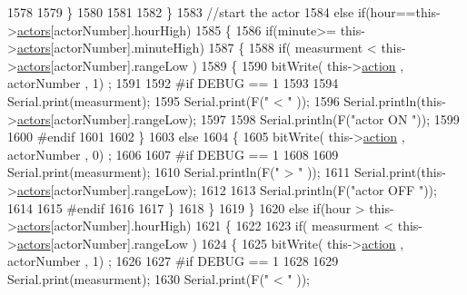 \begin{DoxyCode}
1578             
1579         \}
1580 
1581 
1582     \}
1583     \textcolor{comment}{//start the actor}
1584     \textcolor{keywordflow}{else} \textcolor{keywordflow}{if}(hour==this->\hyperlink{class_jetpack_a7e16d2f97837f9712a2e6de1c50d99db}{actors}[actorNumber].hourHigh)
1585     \{
1586         \textcolor{keywordflow}{if}(minute>= this->\hyperlink{class_jetpack_a7e16d2f97837f9712a2e6de1c50d99db}{actors}[actorNumber].minuteHigh)
1587         \{
1588             \textcolor{keywordflow}{if}( measurment < this->\hyperlink{class_jetpack_a7e16d2f97837f9712a2e6de1c50d99db}{actors}[actorNumber].rangeLow )
1589             \{
1590                 bitWrite( this->\hyperlink{class_jetpack_aca3142925a7b0834b34ae91d26af7765}{action} , actorNumber , 1) ;
1591 
1592 \textcolor{preprocessor}{            #if DEBUG == 1 }
1593 
1594                 Serial.print(measurment);
1595                 Serial.print(F(\textcolor{stringliteral}{" < "} ));
1596                 Serial.println(this->\hyperlink{class_jetpack_a7e16d2f97837f9712a2e6de1c50d99db}{actors}[actorNumber].rangeLow);
1597 
1598                 Serial.println(F(\textcolor{stringliteral}{"actor ON "}));
1599 
1600 \textcolor{preprocessor}{            #endif  }
1601 
1602             \}
1603             \textcolor{keywordflow}{else} 
1604             \{
1605                 bitWrite( this->\hyperlink{class_jetpack_aca3142925a7b0834b34ae91d26af7765}{action} , actorNumber , 0) ;
1606 
1607 \textcolor{preprocessor}{            #if DEBUG == 1 }
1608 
1609                 Serial.print(measurment);
1610                 Serial.println(F(\textcolor{stringliteral}{" > "} ));
1611                 Serial.print(this->\hyperlink{class_jetpack_a7e16d2f97837f9712a2e6de1c50d99db}{actors}[actorNumber].rangeLow);
1612 
1613                 Serial.println(F(\textcolor{stringliteral}{"actor OFF "}));
1614 
1615 \textcolor{preprocessor}{            #endif  }
1616                 
1617             \}
1618         \}
1619     \}
1620     \textcolor{keywordflow}{else} \textcolor{keywordflow}{if}(hour > this->\hyperlink{class_jetpack_a7e16d2f97837f9712a2e6de1c50d99db}{actors}[actorNumber].hourHigh)
1621     \{
1622 
1623         \textcolor{keywordflow}{if}( measurment < this->\hyperlink{class_jetpack_a7e16d2f97837f9712a2e6de1c50d99db}{actors}[actorNumber].rangeLow )
1624         \{
1625             bitWrite( this->\hyperlink{class_jetpack_aca3142925a7b0834b34ae91d26af7765}{action} , actorNumber , 1) ;
1626 
1627 \textcolor{preprocessor}{        #if DEBUG == 1 }
1628 
1629             Serial.print(measurment);
1630             Serial.print(F(\textcolor{stringliteral}{" < "} ));

\end{DoxyCode}
